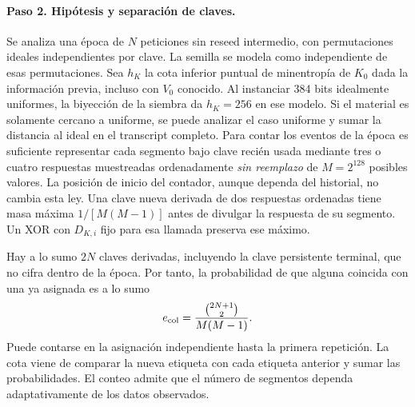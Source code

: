 \documentclass[11pt,a4paper]{article}
\begin{document}
\paragraph{Paso 2. Hipótesis y separación de claves.}
Se analiza una época de \(N\) peticiones sin reseed intermedio,
con permutaciones ideales independientes por clave. La semilla
se modela como independiente de esas permutaciones. Sea
\(h_K\) la cota inferior puntual de minentropía de \(K_0\)
dada la información previa, incluso con \(V_0\) conocido.
Al instanciar 384 bits idealmente uniformes, la biyección
de la siembra da \(h_K=256\) en ese modelo.
Si el material es solamente cercano a uniforme, se puede
analizar el caso uniforme y sumar la distancia al ideal
en el transcript completo. Para contar los eventos de
la época es suficiente representar cada segmento bajo
clave recién usada mediante tres o cuatro respuestas
muestreadas ordenadamente \emph{sin reemplazo} de \(M=2^{128}\)
posibles valores. La posición de inicio del contador,
aunque dependa del historial, no cambia esta ley. Una
clave nueva derivada de dos respuestas ordenadas tiene
masa máxima \(1/[M(M-1)]\) antes de divulgar la respuesta
de su segmento. Un XOR con \(D_{K,i}\) fijo para esa llamada
preserva ese máximo.

Hay a lo sumo \(2N\) claves derivadas, incluyendo la clave
persistente terminal, que no cifra dentro de la época.
Por tanto, la probabilidad de que alguna coincida con una
ya asignada es a lo sumo
\[
             e_{\rm col}=\frac{\binom{2N+1}{2}}{M(M-1)}.
\]
Puede contarse en la asignación independiente hasta la
primera repetición. La cota viene de comparar la nueva
etiqueta con cada etiqueta anterior y sumar las
probabilidades. El conteo admite que el número de
segmentos dependa adaptativamente de los datos observados.
\end{document}
